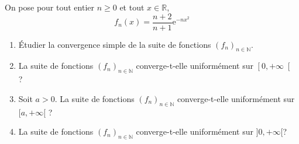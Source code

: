 \documentclass[a4paper,10pt]{report}
\begin{document}
\begin{Exa} On pose pour tout entier $n \geq 0$ et tout $x \in \mathbb{R}$,
$$f_{n}(x) =\dfrac{n+2}{n+1}\mathrm{e}^{-n x^{2}}$$
\begin{enumerate}
\item \'Etudier la convergence simple de la suite de fonctions $\left(f_{n}\right) _{n\in \mathbb{N}}$.
\item     La suite de fonctions  $\left(f_{n}\right) _{n\in \mathbb{N}}$ converge-t-elle uniformément sur $\left[ 0,+\infty\right[$ ?
\item Soit $a>0$. La suite de fonctions $\left(f_{n}\right) _{n\in \mathbb{N}}$ converge-t-elle uniform\'{e}ment sur  $[a,+\infty[$ ?	
\item La suite de fonctions  $\left(f_{n}\right) _{n\in \mathbb{N}}$ converge-t-elle uniform\'{e}ment sur $]0,+\infty[$? 
\end{enumerate}
\end{Exa}
\end{document}

